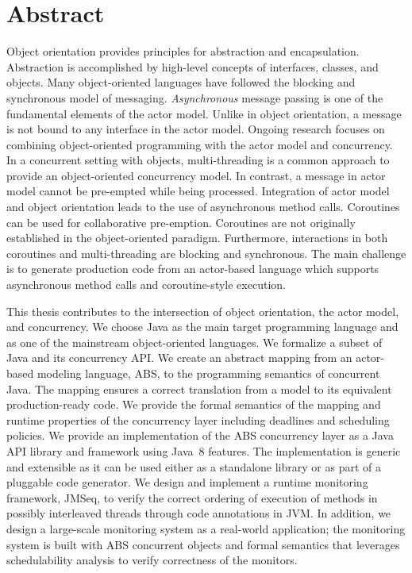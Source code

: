 %
\chapter*{Abstract}
\label{sec:abstract}
\vspace*{-10mm}

Object orientation provides principles for abstraction and encapsulation.
Abstraction is accomplished by high-level concepts of interfaces, classes, and objects.
Many object-oriented languages have followed the blocking and synchronous model of messaging. 
\emph{Asynchronous} message passing is one of the fundamental elements of the actor model.
Unlike in object orientation, a message is not bound to any interface in the actor model.
Ongoing research focuses on combining object-oriented programming with the actor model and concurrency.
In a concurrent setting with objects, multi-threading is a common approach to provide an object-oriented concurrency model.
In contrast, a message in actor model cannot be pre-empted while being processed.
Integration of actor model and object orientation leads to the use of asynchronous method calls.
Coroutines can be used for collaborative pre-emption.
Coroutines are not originally established in the object-oriented paradigm.
Furthermore, interactions in both coroutines and multi-threading are blocking and synchronous.
The main challenge is to generate production code from an actor-based language which supports asynchronous method calls and coroutine-style execution.

This thesis contributes to the intersection of object orientation, the actor model, and concurrency.
We choose Java as the main target programming language and as one of the mainstream 
object-oriented languages. 
We formalize a subset of Java and its concurrency API.
We create an abstract mapping from an actor-based modeling language, ABS, to the programming semantics of concurrent Java. 
The mapping ensures a correct translation from a model to its equivalent production-ready code.
We provide the formal semantics of the mapping and runtime properties of 
the concurrency layer including deadlines and scheduling policies.
We provide an implementation of the ABS concurrency layer as a Java API library and framework using Java~8 features.
The implementation is generic and extensible as it can be used either as a standalone library or as part of a pluggable code generator.
We design and implement a runtime monitoring framework, JMSeq, to verify the
correct ordering of execution of methods in possibly interleaved threads through code annotations in JVM. 
In addition, we design a large-scale monitoring system as a real-world 
application; the monitoring system is built with ABS concurrent objects 
and formal semantics that leverages schedulability analysis to verify correctness of the monitors.

